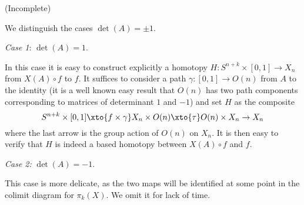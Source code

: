 
\def \L{\mathbb{L}}
\def \simto{\xrightarrow{\sim}}
\def \O{\mathcal{O}}


\mmaketitle

\begin{exercise}[1](Incomplete)\ 

We distinguish the cases $\det(A)=\pm1$.

\textit{Case 1}: $\det(A)=1$.

In this case it is easy to construct explicitly a homotopy $H:S^{n+k}\times[0,1]\to X_n$ from $X(A)\circ f$ to $f$. It suffices to consider a path $\gamma:[0,1]\to O(n)$ from $A$ to the identity (it is a well known easy result that $O(n)$ has two path components corresponding to matrices of determinant $1$ and $-1$) and set $H$ as the composite
\[S^{n+k}\times[0,1]\xto{f\times\gamma}X_n\times O(n)\xto{\tau}O(n)\times X_n\to X_n\]
where the last arrow is the group action of $O(n)$ on $X_n$. It is then easy to verify that $H$ is indeed a based homotopy between $X(A)\circ f$ and $f$.

\textit{Case 2:} $\det(A)=-1$.

This case is more delicate, as the two maps will be identified at some point in the colimit diagram for $\pi_k(X)$. We omit it for lack of time.
\end{exercise}

